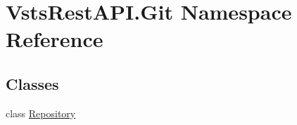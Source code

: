 \hypertarget{namespace_vsts_rest_a_p_i_1_1_git}{}\section{Vsts\+Rest\+A\+P\+I.\+Git Namespace Reference}
\label{namespace_vsts_rest_a_p_i_1_1_git}
\subsection*{Classes}
\begin{DoxyCompactItemize}
\item 
class \mbox{\hyperlink{class_vsts_rest_a_p_i_1_1_git_1_1_repository}{Repository}}
\end{DoxyCompactItemize}

